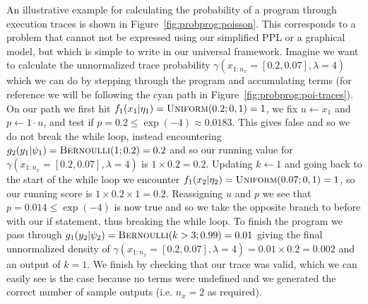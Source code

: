 An illustrative example for calculating the probability of a program through execution traces
is shown in Figure~\ref{fig:probprog:poisson}.  This corresponds to a problem that cannot not be 
expressed using our simplified PPL or a graphical model, but which is simple to write in our universal framework.
Imagine we want to calculate the unnormalized trace probability
$\gamma(x_{1:n_x}=[0.2,0.07],\lambda=4)$ which we can do by stepping through the program and accumulating
terms (for reference we will be following the cyan path
in Figure~\ref{fig:probprog:poi-traces}).  
On our path we first hit $f_1(x_1 | \eta_1) = \textsc{Uniform}(0.2;0,1) = 1$, we fix $u\leftarrow x_1$
and $p\leftarrow 1\cdot u$, and test if $p=0.2\le \exp(-4) \approx 0.0183$.  This gives false
and so we do not break the while loop, instead encountering
$g_2(y_1 | \psi_1) = \textsc{Bernoulli}(1;0.2) = 0.2$ and so our running value for
$\gamma(x_{1:n_x}=[0.2,0.07],\lambda=4)$ is $1\times0.2 = 0.2$.  Updating $k\leftarrow1$ and
going back to the
start of the while loop we encounter $f_1(x_2 | \eta_2) = \textsc{Uniform}(0.07;0,1) = 1$,
so our running score is $1\times0.2\times1=0.2$.
Reassigning $u$ and $p$ we see that  $p=0.014\le \exp(-4)$ is now true and so we take
the opposite branch to before with our if statement, thus breaking the while loop.  To
finish the program we pass through $g_1(y_2 | \psi_2) = \textsc{Bernoulli}(k>3;0.99) = 0.01$
giving the final unnormalized density of $\gamma(x_{1:n_x}=[0.2,0.07],\lambda=4)=0.01\times0.2 = 0.002$ and an output of $k=1$.
We finish by checking that our trace was valid, which we can easily see is the case because
no terms were undefined and we generated the correct number of sample outputs (i.e. $n_x=2$ as
required).

